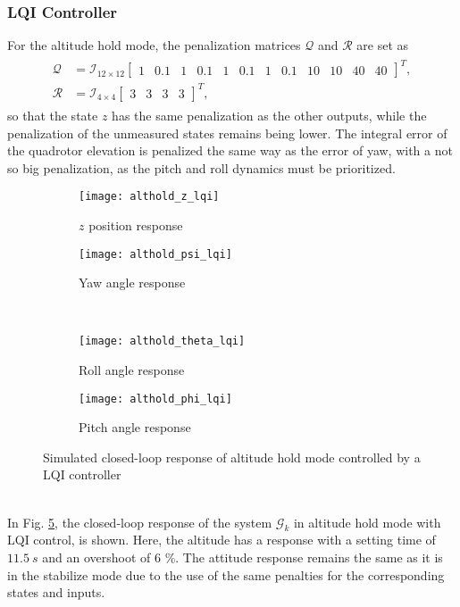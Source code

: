 \subsubsection{LQI Controller}
For the altitude hold mode, the penalization matrices $\mathcal{Q}$ and $\mathcal{R}$ are set as
\begin{align}
\label{eqn:QR_althold}
\begin{split}
\mathcal{Q} & = \mathcal{I}_{12 \times 12}\begin{bmatrix}
1 & 0.1 & 1 & 0.1 & 1 & 0.1 & 1 & 0.1 & 10 & 10 & 40 & 40
\end{bmatrix}^{T},\\
\mathcal{R} & = \mathcal{I}_{4 \times 4}\begin{bmatrix}
3 & 3 & 3 & 3
\end{bmatrix}^{T},
\end{split}
\end{align}
so that the state $z$ has the same penalization as the other outputs, while the penalization of the unmeasured states remains being lower. The integral error of the quadrotor elevation is penalized the same way as the error of yaw, with a not so big penalization, as the pitch and roll dynamics must be prioritized.
\begin{figure}[h]
\begin{subfigure}{.5\linewidth}
\centering
\texttt{[image: althold\_z\_lqi]}
\caption{$z$ position response}
\label{fig:althold_z_lqi}
\end{subfigure}%
\begin{subfigure}{.5\linewidth}
\centering
\texttt{[image: althold\_psi\_lqi]}
\caption{Yaw angle response}
\label{fig:althold_psi_lqi}
\end{subfigure}\\[1ex]
\begin{subfigure}{0.5\linewidth}
\centering
\texttt{[image: althold\_theta\_lqi]}
\caption{Roll angle response}
\label{fig:althold_theta_lqi}
\end{subfigure}
\begin{subfigure}{0.5\linewidth}
\centering
\texttt{[image: althold\_phi\_lqi]}
\caption{Pitch angle response}
\label{fig:althold_phi_lqi}
\end{subfigure}
\caption{Simulated closed-loop response of altitude hold mode controlled by a LQI controller}
\label{fig:althold_lqi}
\end{figure}
\\
In Fig. \ref{fig:althold_lqi}, the closed-loop response of the system $\mathcal{G}_k$ in altitude hold mode with LQI control, is shown. Here, the altitude has a response with a setting time of $11.5\ s$ and an overshoot of $6$ \%. The attitude response remains the same as it is in the stabilize mode due to the use of the same penalties for the corresponding states and inputs. 

